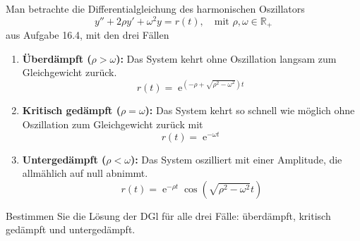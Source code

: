 {
Man betrachte die Differentialgleichung des harmonischen Oszillators
\[
y'' + 2\rho y' + \omega^2 y = r(t), \quad \text{mit } \rho, \omega \in \mathbb R_+
\]
aus Aufgabe 16.4, %
mit den drei Fällen
\begin{enumerate}
  \item \textbf{Überdämpft (\( \rho > \omega \)):} Das System kehrt ohne Oszillation langsam zum Gleichgewicht zurück.
  $$
  r(t) = \operatorname{e}^{(-\rho + \sqrt{\rho^2 - \omega^2})t}
  $$
  \item \textbf{Kritisch gedämpft (\( \rho = \omega \)):} Das System kehrt so schnell wie möglich ohne Oszillation zum Gleichgewicht zurück mit
  $$
  r(t) = \operatorname{e}^{-\omega t}
  $$
  \item \textbf{Untergedämpft (\( \rho < \omega \)):} Das System oszilliert mit einer Amplitude, die allmählich auf null abnimmt.
  $$
  r(t) = \operatorname{e}^{-\rho t} \cos(\sqrt{\rho^2 - \omega^2}t)
  $$
\end{enumerate}
Bestimmen Sie die Lösung der DGl für alle drei Fälle: überdämpft, kritisch gedämpft und untergedämpft.

}





